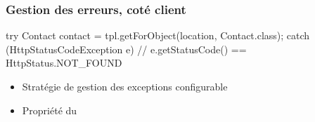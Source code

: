 \begin{frame}[fragile]
 \frametitle{Gestion des erreurs, coté client}

 \begin{javacode}
try {
  Contact contact = tpl.getForObject(location, Contact.class);
} catch (HttpStatusCodeException e) {
  // e.getStatusCode() == HttpStatus.NOT\_FOUND
}
 \end{javacode}

 \begin{itemize}
  \item Stratégie de gestion des exceptions configurable
  \item Propriété  du 
 \end{itemize}

\end{frame}
